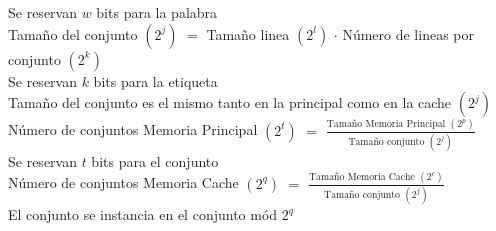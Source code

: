 \documentclass[fleqn]{article}
\begin{document}
	Se reservan $w$ bits para la palabra \\
	
	Tamaño del conjunto $(2^j)$ $=$ Tamaño linea $(2^l)$ $\cdot$ Número de lineas por conjunto $(2^k)$ \\
	
	Se reservan $k$ bits para la etiqueta \\
	
	Tamaño del conjunto es el mismo tanto en la principal como en la cache $(2^j)$ \\
	
	Número de conjuntos Memoria Principal $(2^t)$ $=$ $\frac{\text{Tamaño Memoria Principal $(2^p)$}}{\text{Tamaño conjunto $(2^j)$}}$ \\
	
	Se reservan $t$ bits para el conjunto \\
	
	Número de conjuntos Memoria Cache $(2^q)$ $=$ $\frac{\text{Tamaño Memoria Cache $(2^c)$}}{\text{Tamaño conjunto $(2^j)$}}$ \\
	
	El conjunto se instancia en el conjunto mód $2^q$
\end{document}
